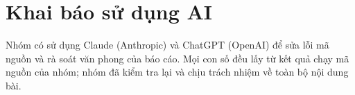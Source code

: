 \documentclass[12pt,a4paper]{report}
\begin{document}
\chapter{Khai báo sử dụng AI}
\label{sec:ai}

Nhóm có sử dụng Claude (Anthropic) và ChatGPT (OpenAI) để sửa lỗi
mã nguồn và rà soát văn phong của báo cáo. Mọi con số đều lấy từ kết quả chạy mã
nguồn của nhóm; nhóm đã kiểm tra lại và chịu trách nhiệm về toàn bộ nội dung bài.

\newpage

\printbibliography[heading=bibintoc,title={Tài liệu tham khảo}]
\end{document}
